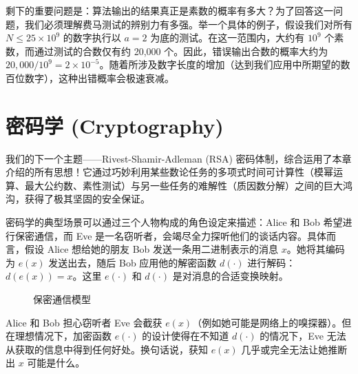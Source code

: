 剩下的重要问题是：算法输出的结果真正是素数的概率有多大？为了回答这一问题，我们必须理解费马测试的辨别力有多强。举一个具体的例子，假设我们对所有 $N \le 25 \times 10^9$ 的数字执行以 $a = 2$ 为底的测试。在这一范围内，大约有 $10^9$ 个素数，而通过测试的合数仅有约 20,000 个。因此，错误输出合数的概率大约为 $20,000 / 10^9 = 2 \times 10^{-5}$。随着所涉及数字长度的增加（达到我们应用中所期望的数百位数字），这种出错概率会极速衰减。

\section{密码学 (Cryptography)}

我们的下一个主题——Rivest-Shamir-Adleman (RSA) 密码体制，综合运用了本章介绍的所有思想！它通过巧妙利用某些数论任务的多项式时间可计算性（模幂运算、最大公约数、素性测试）与另一些任务的难解性（质因数分解）之间的巨大鸿沟，获得了极其坚固的安全保证。

密码学的典型场景可以通过三个人物构成的角色设定来描述：Alice 和 Bob 希望进行保密通信，而 Eve 是一名窃听者，会竭尽全力探听他们的谈话内容。具体而言，假设 Alice 想给她的朋友 Bob 发送一条用二进制表示的消息 $x$。她将其编码为 $e(x)$ 发送出去，随后 Bob 应用他的解密函数 $d(\cdot)$ 进行解码：$d(e(x)) = x$。这里 $e(\cdot)$ 和 $d(\cdot)$ 是对消息的合适变换映射。

\begin{figure}[htbp]
\centering
{}
\caption{保密通信模型}
\label{fig:crypto_model}
\end{figure}

Alice 和 Bob 担心窃听者 Eve 会截获 $e(x)$（例如她可能是网络上的嗅探器）。但在理想情况下，加密函数 $e(\cdot)$ 的设计使得在不知道 $d(\cdot)$ 的情况下，Eve 无法从获取的信息中得到任何好处。换句话说，获知 $e(x)$ 几乎或完全无法让她推断出 $x$ 可能是什么。

